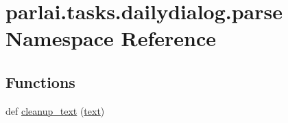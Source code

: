 \hypertarget{namespaceparlai_1_1tasks_1_1dailydialog_1_1parse}{}\section{parlai.\+tasks.\+dailydialog.\+parse Namespace Reference}
\label{namespaceparlai_1_1tasks_1_1dailydialog_1_1parse}
\subsection*{Functions}
\begin{DoxyCompactItemize}
\item 
def \hyperlink{namespaceparlai_1_1tasks_1_1dailydialog_1_1parse_a9bee736957d0b4eb0a046855faa821dc}{cleanup\+\_\+text} (\hyperlink{namespaceparlai_1_1tasks_1_1dailydialog_1_1parse_ad0b494b4bb78b7da65dba688516fd065}{text})
\end{DoxyCompactItemize}
